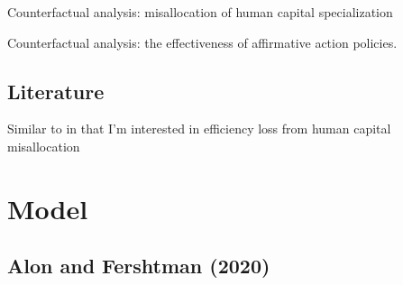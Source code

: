 \documentclass[10 pt]{article}
\newcommand{\nobib}[1]{}
\newcommand{\nobib}[1]{#1}
\begin{document}
{\begin{outline}
\begin{blist}
\item Counterfactual analysis: misallocation of human capital specialization

\item Counterfactual analysis: the effectiveness of affirmative action policies. 

\end{blist}





\end{outline}

\subsection*{Literature}

\begin{blist}

\item Similar to \textcite{D08} in that I'm interested in efficiency loss from human capital misallocation 

\end{blist}


} %


\section{Model}

\subsection{Alon and Fershtman (2020)} \nobib{\nocite{AF20}}
\end{document}
